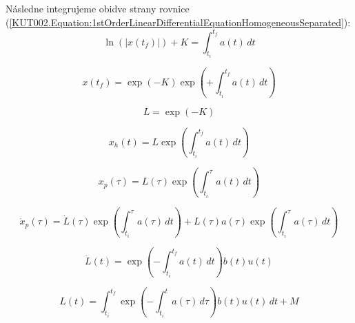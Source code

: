 \documentclass[a4paper, 10pt, ]{article}
\theoremstyle{definition}
\begin{document}
\noindent Následne integrujeme obidve strany rovnice (\ref{KUT002.Equation:1stOrderLinearDifferentialEquationHomogeneousSeparated}):
\begin{equation}
    \ln \left( |x(t_f)| \right) + K = \int_{t_i}^{t_f} a(t) \, dt
\end{equation}


\begin{equation}
    x(t_f) = \exp(-K) \exp \left( + \int_{t_i}^{t_f} a(t) \, dt \right)
\end{equation}

\begin{equation}
    L = \exp(-K)
\end{equation}

\begin{equation}
    \label{KUT002.Equation:HomogeneousSolution}
    x_h(t) = L \exp \left( \int_{t_i}^{t_f} a(t) \, dt \right)
\end{equation}

\begin{equation}
    x_p(\tau) = L(\tau) \exp \left( \int_{t_i}^{\tau} a(t) \, dt \right)
\end{equation}

\begin{equation}
    \dot{x}_p(\tau) = 
    \dot{L}(\tau) \exp \left( \int_{t_i}^{\tau} a(\tau) \, dt \right) + 
    L(\tau) a(\tau) \exp \left( \int_{t_i}^{\tau} a(\tau) \, dt \right)
\end{equation}

\begin{equation}
    \dot{L}(t)  = 
    \exp \left( -\int_{t_i}^{t_f} a(t) \, dt \right) b(t) u(t)
\end{equation}

\begin{equation}
    L(t) = \int_{t_i}^{t_f} \exp \left( -\int_{t_i}^{t} a(\tau) \, d\tau \right) b(t) u(t) \, dt + M
\end{equation}
\end{document}
